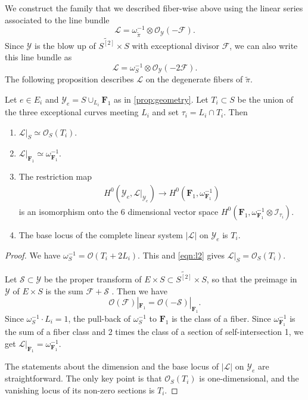 \documentclass[11pt,reqno, letterpaper]{amsart}
\renewcommand{\to}{{\longrightarrow}}
\numberwithin{equation}{section}
\renewcommand{\O}{\mathcal O}
\newcommand{\F}{\mathbf F}
\begin{document}
We construct the family that we described fiber-wise above using the linear series associated to the line bundle
\begin{equation}\label{eqn:l1}
  \mathcal L = \omega_{\widetilde \pi}^{-1} \otimes \O_{\mathcal Y}(-\mathcal F).
\end{equation}
Since $\mathcal Y$ is the blow up of $\widetilde{S^{[2]}} \times S$ with exceptional divisor $\mathcal F$, we can also write this line bundle as
\begin{equation}\label{eqn:l2}
  \mathcal L = \omega_{S}^{-1} \otimes \O_{\mathcal Y}(-2\mathcal F).
\end{equation}
The following proposition describes $\mathcal L$ on the degenerate fibers of $\widetilde \pi$.
\begin{proposition}
  \label{prop:LYe}
  Let $e \in E_{i}$ and $\mathcal{Y}_{e} = S \cup_{L_{i}} \F_{1}$ as in \autoref{prop:geometry}.
  Let $T_i \subset S$ be the union of the three exceptional curves meeting $L_i$ and set $\tau_i = L_i \cap T_i$.
  Then
  \begin{enumerate}
  \item $\mathcal{L}|_{S} \simeq \O_{S}(T_{i})$. 
  \item $\mathcal{L}|_{\F_{1}} \simeq \omega_{\F_1}^{-1}$.
  \item The restriction map
  \begin{align}
    \label{eq:restrL}
    H^{0}(\mathcal{Y}_{e}, \mathcal{L}|_{\mathcal{Y}_{e}}) \to H^{0}(\F_{1}, \omega_{\F_1}^{-1})
  \end{align}
  is an isomorphism onto the $6$ dimensional vector space
  $H^{0}\left(\F_{1}, \omega_{\F_1}^{-1}\otimes \mathcal{I}_{\tau_{i}}\right).$
\item The base locus of the complete linear system $|\mathcal L|$ on $\mathcal Y_e$ is $T_i$.
  \end{enumerate}
\end{proposition}
\begin{proof}
  We have $\omega_S^{-1} = \O(T_i + 2L_i)$.
  This and \eqref{eqn:l2} gives $\mathcal L|_S = \O_S(T_i)$.

  Let $\mathcal S \subset \mathcal Y$ be the proper transform of $E \times S \subset \widetilde{S^{[2]}} \times S$, so that the preimage in $\mathcal Y$ of $E \times S$ is the sum $\mathcal F + \mathcal S$  .
  Then we have
  \[\O(\mathcal F)|_{\F_1} = \O(-\mathcal S)|_{\F_1}.\]
  Since $\omega_S^{-1} \cdot L_i = 1$, the pull-back of $\omega_S^{-1}$ to $\F_1$ is the class of a fiber.
  Since $\omega^{-1}_{\F_1}$ is the sum of a fiber class and 2 times the class of a section of self-intersection 1, we get $\mathcal L|_{\F_1} = \omega_{\F_1}^{-1}$.

  The statements about the dimension and the base locus of $|\mathcal L|$ on $\mathcal Y_e$ are straightforward.
  The only key point is that $\O_S(T_i)$ is one-dimensional, and the vanishing locus of its non-zero sections is $T_i$.
\end{proof}
\end{document}
